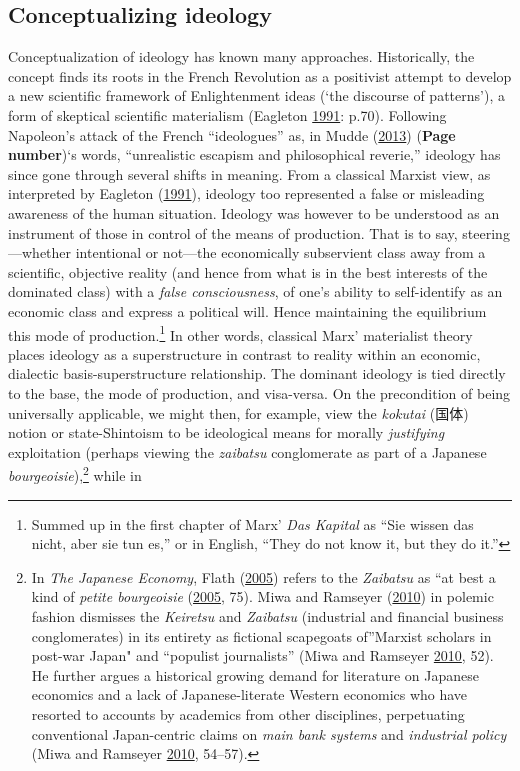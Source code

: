 \documentclass[10pt,british,A4paper,,openany]{memoir}
\begin{document}
\subsection{Conceptualizing ideology}\label{conceptualizing-ideology}

Conceptualization of ideology has known many approaches. Historically,
the concept finds its roots in the French Revolution as a positivist
attempt to develop a new scientific framework of Enlightenment ideas
(`the discourse of patterns'), a form of skeptical scientific
materialism (Eagleton
\protect\hyperlink{ref-eagleton_ideology:_1991}{1991}: p.70). Following
Napoleon's attack of the French ``ideologues'' as, in Mudde
(\protect\hyperlink{ref-mudde_oxford_2013}{2013}) (\textbf{Page
number})`s words, ``unrealistic escapism and philosophical reverie,''
ideology has since gone through several shifts in meaning. From a
classical Marxist view, as interpreted by Eagleton
(\protect\hyperlink{ref-eagleton_ideology:_1991}{1991}), ideology too
represented a false or misleading awareness of the human situation.
Ideology was however to be understood as an instrument of those in
control of the means of production. That is to say, steering---whether
intentional or not---the economically subservient class away from a
scientific, objective reality (and hence from what is in the best
interests of the dominated class) with a \emph{false consciousness}, of
one's ability to self-identify as an economic class and express a
political will. Hence maintaining the equilibrium this mode of
production.\footnote{Summed up in the first chapter of Marx' \emph{Das
  Kapital} as ``Sie wissen das nicht, aber sie tun es,'' or in English,
  ``They do not know it, but they do it.''} In other words, classical
Marx' materialist theory places ideology as a superstructure in contrast
to reality within an economic, dialectic basis-superstructure
relationship. The dominant ideology is tied directly to the base, the
mode of production, and visa-versa. On the precondition of being
universally applicable, we might then, for example, view the
\emph{kokutai} (国体) notion or state-Shintoism to be ideological means
for morally \emph{justifying} exploitation (perhaps viewing the
\emph{zaibatsu} conglomerate as part of a Japanese
\emph{bourgeoisie}),\footnote{In \emph{The Japanese Economy}, Flath
  (\protect\hyperlink{ref-flath_japanese_2005}{2005}) refers to the
  \emph{Zaibatsu} as ``at best a kind of \emph{petite bourgeoisie}
  (\protect\hyperlink{ref-flath_japanese_2005}{2005}, 75). Miwa and
  Ramseyer (\protect\hyperlink{ref-miwa_fable_2010}{2010}) in polemic
  fashion dismisses the \emph{Keiretsu} and \emph{Zaibatsu} (industrial
  and financial business conglomerates) in its entirety as fictional
  scapegoats of''Marxist scholars in post-war Japan" and ``populist
  journalists'' (Miwa and Ramseyer
  \protect\hyperlink{ref-miwa_fable_2010}{2010}, 52). He further argues
  a historical growing demand for literature on Japanese economics and a
  lack of Japanese-literate Western economics who have resorted to
  accounts by academics from other disciplines, perpetuating
  conventional Japan-centric claims on \emph{main bank systems} and
  \emph{industrial policy} (Miwa and Ramseyer
  \protect\hyperlink{ref-miwa_fable_2010}{2010}, 54--57).} while in
\end{document}
